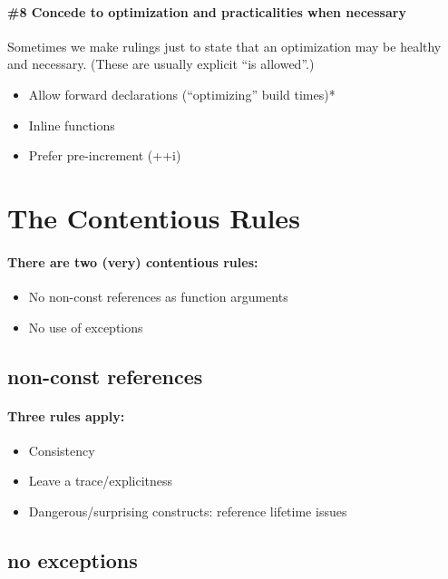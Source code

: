 \paragraph*{\#8 Concede to optimization and practicalities when necessary}\mbox{}\newline
Sometimes we make rulings just to state that an optimization may be healthy and necessary. (These are usually explicit \enquote{is allowed}.)
\begin{itemize}
    \item Allow forward declarations (\enquote{optimizing} build times)*
    \item Inline functions
    \item Prefer pre-increment (++i)
\end{itemize}

\section{The Contentious Rules}\label{sec:the-contentious-rules}
\paragraph*{There are two (very) contentious rules:}
\begin{itemize}
    \item No non-const references as function arguments
    \item No use of exceptions
\end{itemize}

\subsection{non-const references}
\paragraph*{Three rules apply:}
\begin{itemize}
    \item Consistency
    \item Leave a trace/explicitness
    \item Dangerous/surprising constructs: reference lifetime issues
\end{itemize}

\subsection{no exceptions}
